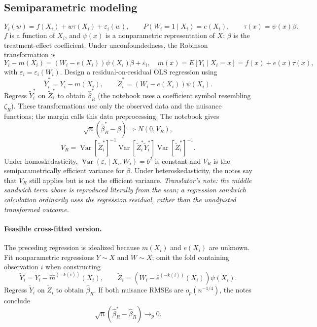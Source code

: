 \subsection{Semiparametric modeling}
\[
Y_i(w)=f(X_i)+w\tau(X_i)+\varepsilon_i(w),\qquad
P(W_i=1\mid X_i)=e(X_i),\qquad \tau(x)=\psi(x)\beta.
\]
$f$ is a function of $X_i$, and $\psi(x)$ is a nonparametric representation of $X$; $\beta$ is the treatment-effect coefficient. Under unconfoundedness, the Robinson transformation is
\[
Y_i-m(X_i)=(W_i-e(X_i))\psi(X_i)\beta+\varepsilon_i,
\quad m(x)=E[Y_i\mid X_i=x]=f(x)+e(x)\tau(x),
\]
with $\varepsilon_i=\varepsilon_i(W_i)$.
Design a residual-on-residual OLS regression using
\[
\widetilde Y_i^*=Y_i-m(X_i),\qquad
\widetilde Z_i^*=(W_i-e(X_i))\psi(X_i).
\]
Regress $\widetilde Y_i^*$ on $\widetilde Z_i^*$ to obtain $\widehat\beta_R^*$ (the notebook uses a coefficient symbol resembling $\zeta_R$). These transformations use only the observed data and the nuisance functions; the margin calls this data preprocessing. The notebook gives
\[
\sqrt n(\widehat\beta_R^*-\beta)\Rightarrow N(0,V_R),
\]
\[
V_R=\operatorname{Var}[\widetilde Z_i^*]^{-1}
\operatorname{Var}[\widetilde Z_i^*\widetilde Y_i^*]
\operatorname{Var}[\widetilde Z_i^*]^{-1}.
\]
Under homoskedasticity, $\operatorname{Var}(\varepsilon_i\mid X_i,W_i)=b^2$ is constant and $V_R$ is the semiparametrically efficient variance for $\beta$. Under heteroskedasticity, the notes say that $V_R$ still applies but is not the efficient variance.
\textit{Translator's note: the middle sandwich term above is reproduced literally from the scan; a regression sandwich calculation ordinarily uses the regression residual, rather than the unadjusted transformed outcome.}
\paragraph{Feasible cross-fitted version.}
The preceding regression is idealized because $m(X_i)$ and $e(X_i)$ are unknown. Fit nonparametric regressions $Y\sim X$ and $W\sim X$; omit the fold containing observation $i$ when constructing
\[
\widetilde Y_i=Y_i-\widehat m^{(-k(i))}(X_i),\qquad
\widetilde Z_i=(W_i-\widehat e^{(-k(i))}(X_i))\psi(X_i).
\]
Regress $\widetilde Y_i$ on $\widetilde Z_i$ to obtain $\widehat\beta_R$. If both nuisance RMSEs are $o_p(n^{-1/4})$, the notes conclude
\[
\sqrt n(\widehat\beta_R^*-\widehat\beta_R)\longrightarrow_p0.
\]
